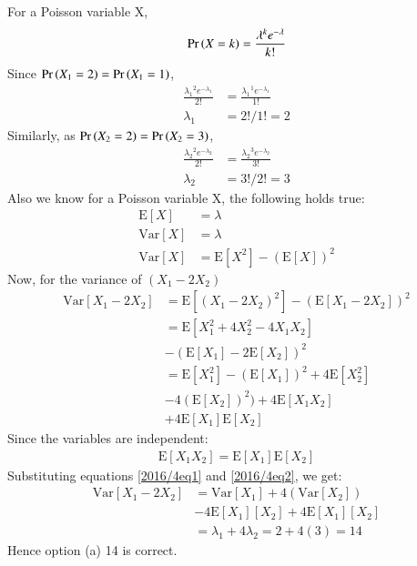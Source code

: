 \newcommand{\E}{\mathrm{E}}
\newcommand{\Var}{\mathrm{Var}}
For a Poisson variable X,
\begin{align}
\Pr\left(X=k\right) = \frac{\lambda^{k}e^{-\lambda}}{k!}
\end{align}
Since $\Pr\left(X_1=2\right) = \Pr\left(X_1=1\right)$,
\begin{align}
\frac{{\lambda_1}^{2}e^{-{\lambda_1}}}{2!} &= \frac{{\lambda_1}^{1}e^{-{\lambda_1}}}{1!} \\
\lambda_1 &= 2!/1! = 2
\end{align}
Similarly, as $\Pr\left(X_2=2\right) = \Pr\left(X_2=3\right)$,
\begin{align}
\frac{{\lambda_2}^{2}e^{-{\lambda_2}}}{2!} &= \frac{{\lambda_2}^{3}e^{-{\lambda_2}}}{3!} \\
\lambda_2 &= 3!/2! = 3
\end{align}
Also we know for a Poisson variable X, the following holds true:
\begin{align}
\E[X] &= \lambda \\
\Var[X] &= \lambda \label{2016/4eq1} \\
\Var[X] &= \E[X^2] - (\E[X])^2 \label{2016/4eq2} 
\end{align}
Now, for the variance of $(X_1 - 2X_2)$
\begin{align}
\Var[X_1 - 2X_2] &= \E[(X_1 - 2X_2)^2] - (\E[X_1 - 2X_2])^2 \nonumber \\
&= \E[X_1^2 + 4X_2^2 - 4X_1X_2] \nonumber \\
&- (\E[X_1] - 2\E[X_2])^2 \nonumber \\
&= \E[X_1^2] - (\E[X_1])^2 + 4\E[X_2^2] \nonumber \\
& -4(\E[X_2])^2) + 4\E[X_1X_2] \nonumber \\
& + 4\E[X_1]\E[X_2]
\end{align}
Since the variables are independent:
\begin{align}
\E[X_1X_2] = \E[X_1]\E[X_2]
\end{align}
Substituting equations \eqref{2016/4eq1} and \eqref{2016/4eq2}, we get:
\begin{align}
\Var[X_1 - 2X_2] &= \Var[X_1] + 4(\Var[X_2]) \nonumber \\
&- 4\E[X_1][X_2] + 4\E[X_1][X_2] \nonumber \\
&= \lambda_1 + 4\lambda_2 = 2 + 4(3) = 14
\end{align}
Hence option (a) 14 is correct.
